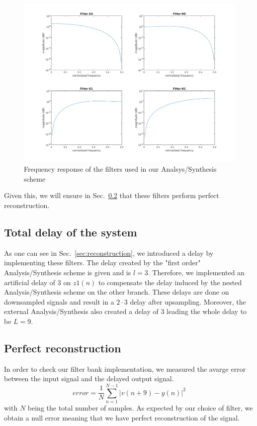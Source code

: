 \documentclass[a4paper,twocolumn]{article}
\begin{document}
\begin{figure}[!ht]
  \begin{center}
    \includegraphics[width=1.1\columnwidth]{filters2.png}
  \end{center}
  \caption{Frequency response of the filters used in our Analsys/Synthesis scheme}
  \label{fig:filters}
\end{figure}


Given this, we will ensure in Sec.~\ref{sec:numreconstruction} that these filters perform perfect reconstruction.


\subsection{Total delay of the system}
As one can see in Sec.~\ref{sec:reconstruction}, we introduced a delay by implementing these filters. The delay created by the "first order" Analysis/Synthesis scheme is given and is $l=3$. Therefore, we implemented an artificial delay of $3$ on $z{1}(n)$ to compensate the delay induced by the nested Analysis/Synthesis scheme on the other branch. These delays are done on downsampled signals and result in a $2 \cdot 3$ delay after upsampling. Moreover, the external Analysis/Synthesis also created a delay of 3 leading the whole delay to be $L=9$.

\subsection{Perfect reconstruction}
\label{sec:numreconstruction}
In order to check our filter bank implementation, we measured the avarge error between the input signal and the delayed output signal.
\begin{equation}
error=\frac{1}{N}\sum_{n=1}^{N-1}|v(n+9)-y(n)|^{2}
\end{equation}
with $N$ being the total number of samples. As expected by our choice of filter, we obtain a null error meaning that we have perfect reconstruction of the signal.
\end{document}
